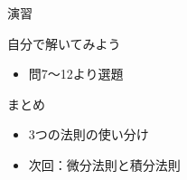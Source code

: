 \documentclass[aspectratio=43,professionalfonts,handout]{beamer}
\begin{document}
\begin{frame}{演習}
  \begin{exampleblock}{自分で解いてみよう}
  \begin{itemize}
    \item 問7〜12より選題
  \end{itemize}
  \end{exampleblock}
\end{frame}

\begin{frame}{まとめ}
  \begin{itemize}
    \item 3つの法則の使い分け
    \item 次回：微分法則と積分法則
  \end{itemize}
\end{frame}
\end{document}
